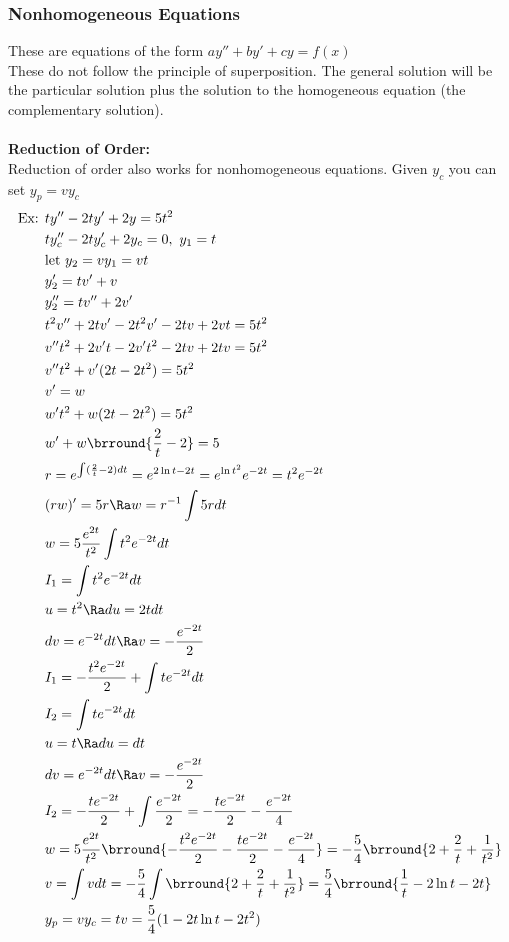 \subsubsection{Nonhomogeneous Equations}
These are equations of the form $ay''+by'+cy=f(x)$\\
These do not follow the principle of superposition. The general solution will be the particular solution plus the solution to the homogeneous equation (the complementary solution).\\
\\
\textbf{Reduction of Order:}\\
Reduction of order also works for nonhomogeneous equations. Given $y_c$ you can set $y_p=vy_c$
\begin{align*}
    \text{Ex: }&ty''-2ty'+2y=5t^2\\
    &ty_c''-2ty_c'+2y_c=0,\ y_1=t\\
    &\text{let }y_2=vy_1=vt\\
    &y_2'=tv'+v\\
    &y_2''=tv''+2v'\\
    &t^2v''+2tv'-2t^2v'-2tv+2vt=5t^2\\
    &v''t^2+2v't-2v't^2-2tv+2tv=5t^2\\
    &v''t^2+v'(2t-2t^2)=5t^2\\
    &v'=w\\
    &w't^2+w(2t-2t^2)=5t^2\\
    &w'+w\brround{\frac{2}{t}-2}=5\\
    &r=e^{\int(\frac{2}{t}-2)dt}=e^{2\ln t-2t}=e^{\ln t^2}e^{-2t}=t^2e^{-2t}\\
    &(rw)'=5r\Ra w=r^{-1}\int 5rdt\\
    &w=5\frac{e^{2t}}{t^2}\int t^2e^{-2t}dt\\
    &I_1=\int t^2e^{-2t}dt\\
    &u=t^2\Ra du=2tdt\\
    &dv=e^{-2t}dt\Ra v=-\frac{e^{-2t}}{2}\\
    &I_1=-\frac{t^2e^{-2t}}{2}+\int te^{-2t}dt\\
    &I_2=\int te^{-2t}dt\\
    &u=t\Ra du=dt\\
    &dv=e^{-2t}dt\Ra v=-\frac{e^{-2t}}{2}\\
    &I_2=-\frac{te^{-2t}}{2}+\int\frac{e^{-2t}}{2}=-\frac{te^{-2t}}{2}-\frac{e^{-2t}}{4}\\
    &w=5\frac{e^{2t}}{t^2}\brround{-\frac{t^2e^{-2t}}{2}-\frac{te^{-2t}}{2}-\frac{e^{-2t}}{4}}=-\frac{5}{4}\brround{2+\frac{2}{t}+\frac{1}{t^2}}\\
    &v=\int vdt=-\frac{5}{4}\int\brround{2+\frac{2}{t}+\frac{1}{t^2}}=\frac{5}{4}\brround{\frac{1}{t}-2\ln t-2t}\\
    &y_p=vy_c=tv=\frac{5}{4}(1-2t\ln t-2t^2)
\end{align*}

